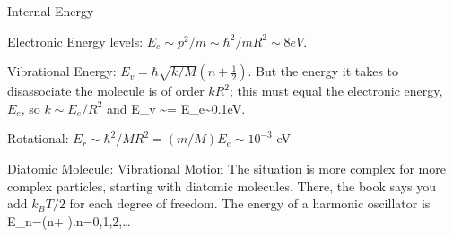 \documentclass[11pt]{book}
\begin{document}
\item Internal Energy
\bee
\item Electronic Energy levels: $E_e\sim p^2/m\sim \hbar^2/mR^2 \sim 8 eV$.
\item Vibrational Energy: $E_v=\hbar \sqrt{k/M}\left( n+ \frac12\right)$. But the energy it takes to disassociate the molecule is of order $kR^2$; this must equal the electronic energy, $E_e$, so $k\sim E_e/R^2$ and
\be
E_v \sim {}= E_e\sim 0.1eV.\ee
\item Rotational: $E_r\sim \hbar^2/MR^2 = (m/M) E_e \sim 10^{-3}$ eV
\eee
\item Diatomic Molecule: Vibrational Motion
The situation is more complex for more complex particles, starting with diatomic molecules. There, the book says you add $k_BT/2$ for each degree of freedom. 
The energy of a harmonic oscillator is
\be
E_n=\hbar \omega\left(n+ \right).\qquad n=0,1,2,\ldots\ee
\end{document}
